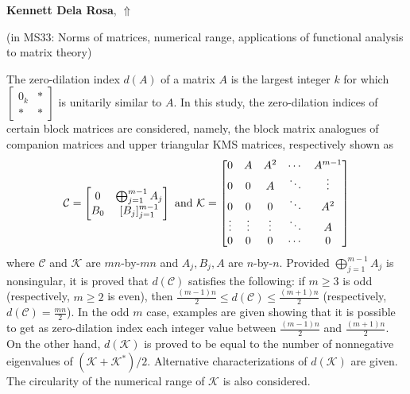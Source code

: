 \documentclass[ILAS2025-program.tex]{subfiles}
\begin{document}
\hypertarget{down0279}{}\begin{ilasabstract}
    
\textbf{Kennett Dela Rosa},  \hfill \hyperlink{up0279}{$\Uparrow$}
    
    
(in {\color{mstitle}MS33: Norms of matrices, numerical range, applications of functional analysis to matrix theory})
        
\mtskip
    The zero-dilation index $d(A) $ of a matrix $A$ is the largest integer $k$ for which $\begin{bmatrix}0_k& *\\ * & *\end{bmatrix}$ is unitarily similar to $A$. In this study, the zero-dilation indices of certain block matrices are considered, namely, the block matrix analogues of companion matrices and upper triangular KMS matrices, respectively shown as \[\mathcal{C}=\begin{bmatrix} 0& \bigoplus_{j=1}^{m-1}A_j \\ B_0& [B_j]_{j=1}^{m-1}\end{bmatrix}\ \textup{and}\ \mathcal{K}=\begin{bmatrix}0& A& A^2&\cdots& A^{m-1}\\ 0 & 0& A& \ddots& \vdots\\ 0& 0 &0 &\ddots& A^2\\ \vdots& \vdots &\vdots & \ddots& A\\ 0& 0 & 0& \cdots &0\end{bmatrix}\]
where $\mathcal{C}$ and $\mathcal{K}$ are $mn$-by-$mn$ and $A_j,B_j,A$ are $n$-by-$n$. Provided $\bigoplus_{j=1}^{m-1}A_j$ is nonsingular, it is proved that $d(\mathcal{C})$ satisfies the following: if $m\geq 3$ is odd (respectively, $m\geq 2$ is even), then $\frac{(m-1)n}{2}\leq d(\mathcal{C})\leq \frac{(m+1)n}{2}$ (respectively, $ d(\mathcal{C})= \frac{mn}{2}$). In the odd $m$ case, examples are given showing that it is possible to get as zero-dilation index each integer value between $\frac{(m-1)n}{2} $ and $\frac{(m+1)n}{2}$. On the other hand, $d(\mathcal{K})$ is proved to be equal to the number of nonnegative eigenvalues of $(\mathcal{K}+\mathcal{K}^*)/2$. Alternative characterizations of $d(\mathcal{K})$ are given. The circularity of the numerical range of $\mathcal{K} $ is also considered.

\end{ilasabstract}
    
\end{document}
